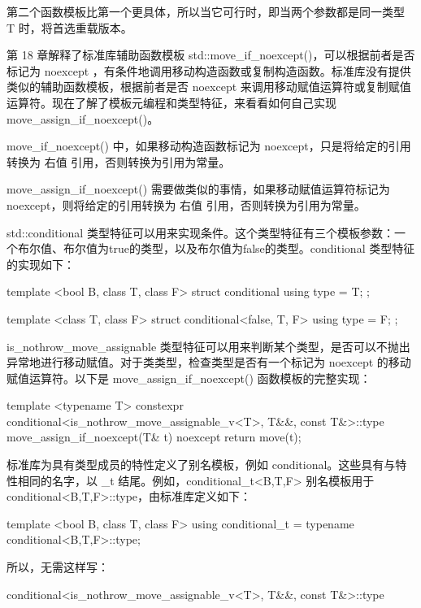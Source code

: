 第二个函数模板比第一个更具体，所以当它可行时，即当两个参数都是同一类型 T 时，将首选重载版本。


第 18 章解释了标准库辅助函数模板 std::move\_if\_noexcept()，可以根据前者是否标记为 noexcept ，有条件地调用移动构造函数或复制构造函数。标准库没有提供类似的辅助函数模板，根据前者是否 noexcept 来调用移动赋值运算符或复制赋值运算符。现在了解了模板元编程和类型特征，来看看如何自己实现 move\_assign\_if\_noexcept()。

move\_if\_noexcept() 中，如果移动构造函数标记为 noexcept，只是将给定的引用转换为 右值 引用，否则转换为引用为常量。

move\_assign\_if\_noexcept() 需要做类似的事情，如果移动赋值运算符标记为 noexcept，则将给定的引用转换为 右值 引用，否则转换为引用为常量。

std::conditional 类型特征可以用来实现条件。这个类型特征有三个模板参数：一个布尔值、布尔值为true的类型，以及布尔值为false的类型。conditional 类型特征的实现如下：

\begin{cpp}
template <bool B, class T, class F>
struct conditional { using type = T; };

template <class T, class F>
struct conditional<false, T, F> { using type = F; };
\end{cpp}

is\_nothrow\_move\_assignable 类型特征可以用来判断某个类型，是否可以不抛出异常地进行移动赋值。对于类类型，检查类型是否有一个标记为 noexcept 的移动赋值运算符。以下是 move\_assign\_if\_noexcept() 函数模板的完整实现：

\begin{cpp}
template <typename T>
constexpr conditional<is_nothrow_move_assignable_v<T>, T&&, const T&>::type
    move_assign_if_noexcept(T& t) noexcept
{
    return move(t);
}
\end{cpp}

标准库为具有类型成员的特性定义了别名模板，例如 conditional。这些具有与特性相同的名字，以 \_t 结尾。例如，conditional\_t<B,T,F> 别名模板用于 conditional<B,T,F>::type，由标准库定义如下：

\begin{cpp}
template <bool B, class T, class F>
using conditional_t = typename conditional<B,T,F>::type;
\end{cpp}

所以，无需这样写：

\begin{cpp}
conditional<is_nothrow_move_assignable_v<T>, T&&, const T&>::type
\end{cpp}

